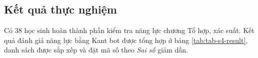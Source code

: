 
\subsection{Kết quả thực nghiệm}

Có 38 học sinh hoàn thành phần kiểm tra năng lực chương Tổ hợp, xác suất. Kết quả đánh giá năng lực bằng Kant bot được tổng hợp ở bảng \ref{tab:tab-s4-result}, danh sách được sắp xếp và đặt mã số theo \textit{Sai số} giảm dần.


